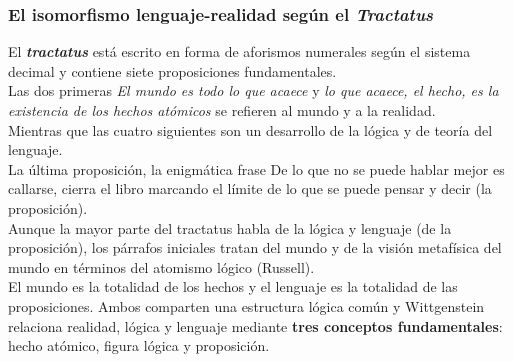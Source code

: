 \documentclass[a4paper, 11pt, twocolumn, spanish]{article}
\begin{document}
\subsubsection{El isomorfismo lenguaje-realidad según el \emph{Tractatus}}
\label{sec:org7bd20f3}
El \textbf{\emph{tractatus}} está escrito en forma de aforismos numerales según el
sistema decimal y contiene siete proposiciones fundamentales.\\
Las dos primeras \emph{El mundo es todo lo que acaece} y \emph{lo que acaece, el
hecho, es la existencia de los hechos atómicos} se refieren al mundo y
a la realidad.\\
Mientras que las cuatro siguientes son un desarrollo de la lógica y de
teoría del lenguaje.\\
La última proposición, la enigmática frase De lo que no se puede
hablar mejor es callarse, cierra el libro marcando el límite de lo que
se puede pensar y decir (la proposición).\\
Aunque la mayor parte del tractatus habla de la lógica y lenguaje (de
la proposición), los párrafos iniciales tratan del mundo y de la
visión metafísica del mundo en términos del atomismo lógico
(Russell).\\
El mundo es la totalidad de los hechos y el lenguaje es la totalidad
de las proposiciones. Ambos comparten una estructura lógica común y
Wittgenstein relaciona realidad, lógica y lenguaje mediante \textbf{tres
conceptos fundamentales}: hecho atómico, figura lógica y
proposición.\\
\end{document}
